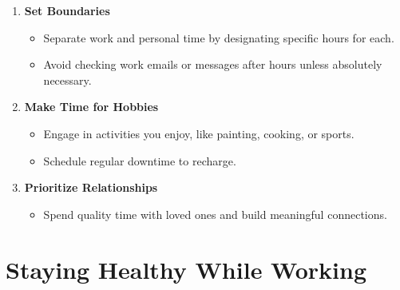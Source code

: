 \documentclass[
  letterpaper,
  DIV=11,
  numbers=noendperiod]{scrreprt}
\providecommand{\tightlist}{%
  \setlength{\itemsep}{0pt}\setlength{\parskip}{0pt}}\usepackage{longtable,booktabs,array}
\begin{document}
\begin{enumerate}
\def\labelenumi{\arabic{enumi}.}
\item
  \textbf{Set Boundaries}

  \begin{itemize}
  \tightlist
  \item
    Separate work and personal time by designating specific hours for
    each.
  \item
    Avoid checking work emails or messages after hours unless absolutely
    necessary.
  \end{itemize}
\item
  \textbf{Make Time for Hobbies}

  \begin{itemize}
  \tightlist
  \item
    Engage in activities you enjoy, like painting, cooking, or sports.
  \item
    Schedule regular downtime to recharge.
  \end{itemize}
\item
  \textbf{Prioritize Relationships}

  \begin{itemize}
  \tightlist
  \item
    Spend quality time with loved ones and build meaningful connections.
  \end{itemize}
\end{enumerate}

\section{Staying Healthy While
Working}\label{staying-healthy-while-working}
\end{document}
